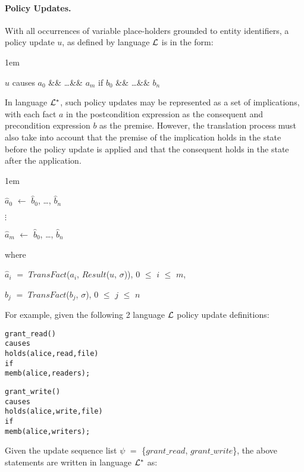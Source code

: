 \documentclass[11pt, twocolumn]{article}
\newenvironment{vquote}
  {\begin{list}{}{\leftmargin 1em}\item[]}
  {\end{list}}
\newenvironment{vverbose}
  {\begin{alltt}}
  {\vspace{-\baselineskip}\end{alltt}}
\begin{document}
        \paragraph{Policy Updates.}

          With all occurrences of variable place-holders grounded to entity
          identifiers, a policy update $u$, as defined by language ${\cal L}$
          is in the form:

          \begin{vquote}
            $u$ causes $a_{0}$ \&\& \ldots \&\& $a_{m}$
            if $b_{0}$ \&\& \ldots \&\& $b_{n}$
          \end{vquote}

          In language ${\cal L}^{*}$, such policy updates may be represented as
          a set of implications, with each fact $a$ in the postcondition
          expression as the consequent and precondition expression $b$ as the
          premise. However, the translation process must also take into account
          that the premise of the implication holds in the state before the
          policy update is applied and that the consequent holds in the state
          after the application.

          \begin{vquote}
            $\hat{a}_{0}$ $\leftarrow$ $\hat{b}_{0}$, \ldots, $\hat{b}_{n}$

            $\vdots$

            $\hat{a}_{m}$ $\leftarrow$ $\hat{b}_{0}$, \ldots, $\hat{b}_{n}$

            where

            $\hat{a}_{i}$ $=$ $TransFact$($a_{i}$, $Result$($u$, $\sigma$)),
            $0$ $\leq$ $i$ $\leq$ $m$,

            $\hat{b}_{j}$ $=$ $TransFact$($b_{j}$, $\sigma$),
            $0$ $\leq$ $j$ $\leq$ $n$
          \end{vquote}

          For example, given the following 2 language ${\cal L}$ policy update
          definitions:

          \begin{vverbose}
grant\_read()
  causes
    holds(alice, read, file)
  if
    memb(alice, readers);

grant\_write()
  causes
    holds(alice, write, file)
  if
    memb(alice, writers);
          \end{vverbose}

          Given the update sequence list $\psi$ $=$
          \{$grant\_read$, $grant\_write$\}, the above statements are written
          in language ${\cal L}^{*}$ as:
\end{document}
